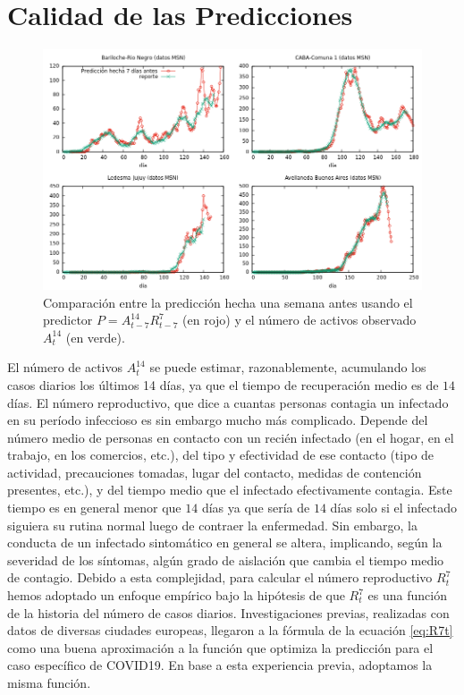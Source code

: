 \documentclass[12pt,a4paper]{article}
\begin{document}
\section*{Calidad de las Predicciones}
\begin{figure}
\begin{center}
\includegraphics[width=14cm,clip=true]{calidadprediccion.png}
\end{center}
\caption{
Comparación entre la predicción hecha una semana antes 
usando el predictor $P=A^{14}_{t-7} R^7_{t-7}$ (en rojo) 
y el número de activos observado $A^{14}_t$ (en verde). 
}
\label{fig:prediccionvsrealidad}
\end{figure}
El número de activos $A^{14}_t$ se puede estimar, 
razonablemente, acumulando los casos diarios los últimos 
14 días, ya que el tiempo de recuperación medio es de $14$ 
días. El número reproductivo, que dice a cuantas personas contagia 
un infectado en su período infeccioso es sin embargo mucho 
más complicado. Depende del número medio de personas en 
contacto con un recién infectado (en el hogar, 
en el trabajo, en los comercios, etc.), 
del tipo y efectividad de ese contacto 
(tipo de actividad, precauciones tomadas, 
lugar del contacto, medidas de contención presentes,
etc.), y del tiempo medio que el 
infectado efectivamente contagia. Este tiempo es en general menor que $14$ días
ya que sería de $14$ días solo si el infectado 
siguiera su rutina normal luego de contraer la enfermedad. 
Sin embargo, la conducta de un
infectado sintomático en general se altera, implicando,
según la severidad de los síntomas, algún grado de aislación que cambia 
el tiempo medio de contagio. Debido a esta complejidad, para calcular 
el número reproductivo $R^7_t$ hemos adoptado un enfoque empírico 
bajo la hipótesis de que $R^7_t$ es una función de la historia del 
número de casos diarios. Investigaciones previas, 
realizadas con datos de diversas ciudades europeas, 
llegaron a la fórmula de la ecuación \ref{eq:R7t} como 
una buena aproximación a la función que optimiza la predicción 
para el caso específico de COVID19. En base a esta experiencia
previa, adoptamos la misma función. 
\end{document}
